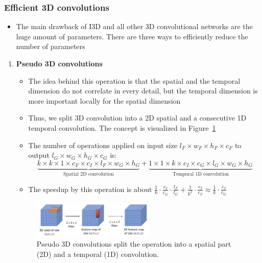 \subsubsection{Efficient 3D convolutions}
\begin{itemize}
	\item The main drawback of I3D and all other 3D convolutional networks are the huge amount of parameters. There are three ways to efficiently reduce the number of parameters
\end{itemize}
\begin{enumerate}
	\item \textbf{Pseudo 3D convolutions}
	\begin{itemize}
		\item The idea behind this operation is that the spatial and the temporal dimension do not correlate in every detail, but the temporal dimension is more important locally for the spatial dimension
		\item Thus, we split 3D convolution into a 2D spatial and a consecutive 1D temporal convolution. The concept is visualized in Figure~\ref{fig:deep_video_pseudo_3D_convs}
		\item The number of operations applied on input size $l_F \times w_F \times h_F \times c_F$ to output $l_G \times w_G \times h_G \times c_G$ is:
		\begin{equation*}
				\underbrace{k \times k \times 1 \times c_F \times c_I \times l_F \times w_G \times h_G}_{\text{Spatial 2D convolution}} + \underbrace{1\times 1\times k \times c_I \times c_G \times l_G \times w_G \times h_G}_{\text{Temporal 1D convolution}}
		\end{equation*}
		\item The speedup by this operation is about $\frac{1}{k}\cdot \frac{c_I}{c_G} \cdot \frac{l_F}{l_G} + \frac{1}{k^2} \cdot \frac{c_I}{c_F}\approx \frac{1}{k}\cdot \frac{c_I}{c_G}$
	\end{itemize}
	\begin{figure}[ht!]
		\centering
		\includegraphics[width=0.55\textwidth]{figures/cv_deep_video_pseudo_3D_conv.png}
		\caption{Pseudo 3D convolutions split the operation into a spatial part (2D) and a temporal (1D) convolution.}
		\label{fig:deep_video_pseudo_3D_convs}
	\end{figure}

\end{enumerate}
